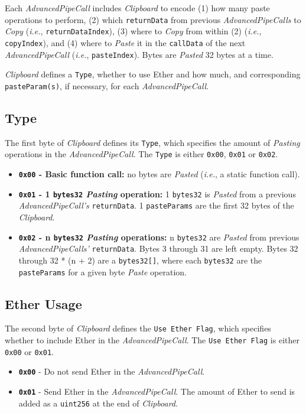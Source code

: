 \documentclass[tikz]{article}
\newcommand{\code}[1]{\texttt{#1}}
\newcommand{\term}[1]{\textsl{#1}}
\begin{document}
Each \term{AdvancedPipeCall} includes \term{Clipboard} to encode (1) how many paste operations to perform, (2) which \code{returnData} from previous \term{AdvancedPipeCalls} to \term{Copy} (\term{i.e.}, \code{returnDataIndex}), (3) where to \term{Copy} from within (2) (\term{i.e.}, \code{copyIndex}), and (4) where to \term{Paste} it in the \code{callData} of the next \term{AdvancedPipeCall} (\term{i.e.}, \code{pasteIndex}). Bytes are \term{Pasted} 32 bytes at a time.

\term{Clipboard} defines a \code{Type}, whether to use Ether and how much, and corresponding \code{pasteParam(s)}, if necessary, for each \term{AdvancedPipeCall}.

\newpage
\subsection{Type}
The first byte of \term{Clipboard} defines its \code{Type}, which specifies the amount of \term{Pasting} operations in the \term{AdvancedPipeCall}. The \code{Type} is either \code{0x00}, \code{0x01} or \code{0x02}.

\begin{itemize}
    \item \textbf{\code{0x00} - Basic function call:} no bytes are \term{Pasted} (\term{i.e.}, a static function call).
    \item \textbf{\code{0x01} - 1 \code{bytes32} \term{Pasting} operation:} 1 \code{bytes32} is \term{Pasted} from a previous \term{AdvancedPipeCall's} \code{returnData}. 1 \code{pasteParams} are the first 32 bytes of the \term{Clipboard}.
    \item \textbf{\code{0x02} - n \code{bytes32} \term{Pasting} operations:} n \code{bytes32} are \term{Pasted} from previous \term{AdvancedPipeCalls'} \code{returnData}. Bytes 3 through 31 are left empty. Bytes 32 through 32 * (n + 2) are a \code{bytes32[]}, where each \code{bytes32} are the \code{pasteParams} for a given byte \term{Paste} operation.
\end{itemize}

\subsection{Ether Usage}
The second byte of \term{Clipboard} defines the \code{Use Ether Flag}, which specifies whether to include Ether in the \term{AdvancedPipeCall}. The \code{Use Ether Flag} is either \code{0x00} or \code{0x01}.

\begin{itemize}
    \item \textbf{\code{0x00}} - Do not send Ether in the \term{AdvancedPipeCall}.
    \item \textbf{\code{0x01}} - Send Ether in the \term{AdvancedPipeCall}. The amount of Ether to send is added as a \code{uint256} at the end of \term{Clipboard}.
\end{itemize}
\end{document}
